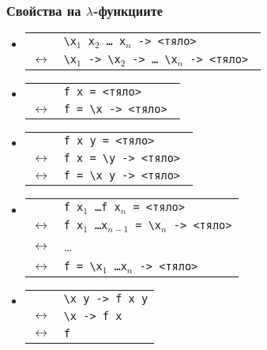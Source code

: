 \documentclass{beamer}
\begin{document}
\begin{frame}
  \frametitle{Свойства на $\lambda$-функциите}
  \newcommand{\eqv}{$\longleftrightarrow$}
  \begin{itemize}[<+->]
  \item
    \begin{tabular}[t]{ll}
      &\tt{\textbackslash x$_1$ x$_2$ \ldots{} x$_n$ ->} <тяло>\\
      \eqv &\tt{\textbackslash x$_1$ -> \textbackslash x$_2$ -> \ldots{} \textbackslash x$_n$ ->}
             <тяло>
    \end{tabular}
  \item
    \begin{tabular}[t]{ll}
      &\tt{f x =} <тяло>\\
      \eqv&  \tt{f = \textbackslash x -> }<тяло>
    \end{tabular}
  \item
    \begin{tabular}[t]{ll}
      &\tt{f x y =} <тяло>\\
      \eqv& \tt{f x = \textbackslash y -> }<тяло>\\
      \eqv& \tt{f = \textbackslash x y -> }<тяло>
    \end{tabular}
  \item
    \begin{tabular}[t]{ll}
      &\tt{f x$_1$ \ldots f x$_n$ =} <тяло>\\
      \eqv& \tt{f x$_1$ \ldots x$_{n-1}$ = \textbackslash x$_n$ ->} <тяло>\\
      \eqv& \ldots\\
      \eqv& \tt{f = \textbackslash x$_1$ \ldots x$_n$ -> }<тяло>
    \end{tabular}
  \item
    \begin{tabular}[t]{ll}
      &\tt{\textbackslash x y -> f x y}\\
      \eqv& \tt{\textbackslash x -> f x}\\
      \eqv& \tt f
    \end{tabular}
  \end{itemize}
\end{frame}
\end{document}
